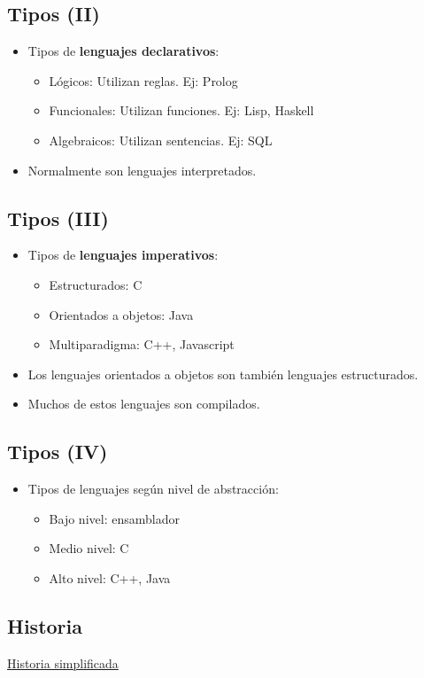 \documentclass[a4paper]{article}
\begin{document}
\subsection{Tipos (II)}
\label{tipos-ii}
\begin{itemize}
\item Tipos de \textbf{lenguajes declarativos}:
\begin{itemize}
\item Lógicos: Utilizan reglas. Ej: Prolog
\item Funcionales: Utilizan funciones. Ej: Lisp, Haskell
\item Algebraicos: Utilizan sentencias. Ej: SQL
\end{itemize}
\item Normalmente son lenguajes interpretados.
\end{itemize}
\subsection{Tipos (III)}
\label{tipos-iii}
\begin{itemize}
\item Tipos de \textbf{lenguajes imperativos}:
\begin{itemize}
\item Estructurados: C
\item Orientados a objetos: Java
\item Multiparadigma: C++, Javascript
\end{itemize}
\item Los lenguajes orientados a objetos son también lenguajes
estructurados.
\item Muchos de estos lenguajes son compilados.
\end{itemize}
\subsection{Tipos (IV)}
\label{tipos-iv}
\begin{itemize}
\item Tipos de lenguajes según nivel de abstracción:
\begin{itemize}
\item Bajo nivel: ensamblador
\item Medio nivel: C
\item Alto nivel: C++, Java
\end{itemize}
\end{itemize}
\subsection{Historia}
\label{sec:org0000015}
\href{http://rigaux.org/language-study/diagram-light.png}{Historia simplificada}
\end{document}

